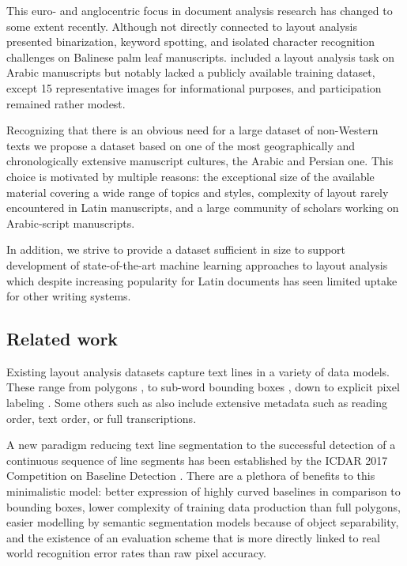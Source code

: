 This euro- and anglocentric focus in document analysis research has changed to
some extent recently. Although not directly connected to layout analysis
\cite{burie2016icfhr} presented binarization, keyword spotting, and isolated
character recognition challenges on Balinese palm leaf manuscripts.
\cite{clausner2018icfhr} included a layout analysis task on Arabic manuscripts
but notably lacked a publicly available training dataset, except 15
representative images for informational purposes, and participation remained
rather modest.

Recognizing that there is an obvious need for a large dataset of non-Western
texts we propose a dataset based on one of the most geographically and
chronologically extensive manuscript cultures, the Arabic and Persian one. This
choice is motivated by multiple reasons: the exceptional size of the available
material covering a wide range of topics and styles, complexity of layout
rarely encountered in Latin manuscripts, and a large community of scholars
working on Arabic-script manuscripts.

In addition, we strive to provide a dataset sufficient in size to support
development of state-of-the-art machine learning ap\-proach\-es to layout analysis
which despite increasing popularity for Latin documents
\cite{barakat2018text,quiros2018multi,fink2018baseline} has seen limited uptake
for other writing systems.

\subsection{Related work}

Existing layout analysis datasets capture text lines in a variety of data
models. These range from polygons
\cite{fischer2011transcription,simistira2016diva,clausner2018icfhr}, to
sub-word bounding boxes \cite{kassis2017vml}, down to explicit pixel labeling
\cite{gatos2010icfhr}. Some others such as
\cite{antonacopoulos2015icdar2015,antonacopoulos2011historical} also include
extensive metadata such as reading order, text order, or full transcriptions.

A new paradigm reducing text line segmentation to the successful detection of a
continuous sequence of line segments has been established by the ICDAR 2017
Competition on Baseline Detection \cite{diem2017cbad}. There are a plethora of
benefits to this minimalistic model: better expression of highly curved
baselines in comparison to bounding boxes, lower complexity of training data
production than full polygons, easier modelling by semantic segmentation models
because of object separability, and the existence of an evaluation scheme
\cite{gruning2018read} that is more directly linked to real world recognition
error rates than raw pixel accuracy.

